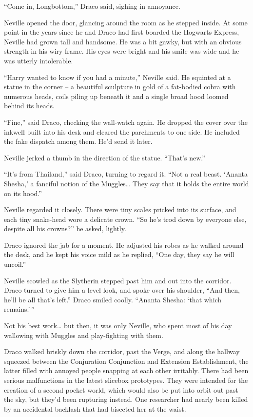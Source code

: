 ``Come in, Longbottom,'' Draco said, sighing in annoyance.

Neville opened the door, glancing around the room as he stepped inside.
At some point in the years since he and Draco had first boarded the
Hogwarts Express, Neville had grown tall and handsome. He was a bit
gawky, but with an obvious strength in his wiry frame. His eyes were
bright and his smile was wide and he was utterly intolerable.

``Harry wanted to know if you had a minute,'' Neville said. He squinted
at a statue in the corner -- a beautiful sculpture in gold of a
fat-bodied cobra with numerous heads, coils piling up beneath it and a
single broad hood loomed behind its heads.

``Fine,'' said Draco, checking the wall-watch again. He dropped the
cover over the inkwell built into his desk and cleared the parchments to
one side. He included the fake dispatch among them. He'd send it later.

Neville jerked a thumb in the direction of the statue. ``That's new.''

``It's from Thailand,'' said Draco, turning to regard it. ``Not a real
beast. `Ananta Shesha,' a fanciful notion of the Muggles\ldots{} They
say that it holds the entire world on its hood.''

Neville regarded it closely. There were tiny scales pricked into its
surface, and each tiny snake-head wore a delicate crown. ``So he's trod
down by everyone else, despite all his crowns?'' he asked, lightly.

Draco ignored the jab for a moment. He adjusted his robes as he walked
around the desk, and he kept his voice mild as he replied, ``One day,
they say he will uncoil.''

Neville scowled as the Slytherin stepped past him and out into the
corridor. Draco turned to give him a level look, and spoke over his
shoulder, ``And then, he'll be all that's left.'' Draco smiled coolly.
``Ananta Shesha: `that which remains.'\,''

Not his best work\ldots{} but then, it was only Neville, who spent most
of his day wallowing with Muggles and play-fighting with them.

Draco walked briskly down the corridor, past the Verge, and along the
hallway squeezed between the Conjuration Conjunction and Extension
Establishment, the latter filled with annoyed people snapping at each
other irritably. There had been serious malfunctions in the latest
slicebox prototypes. They were intended for the creation of a second
pocket world, which would also be put into orbit out past the sky, but
they'd been rupturing instead. One researcher had nearly been killed by
an accidental backlash that had bisected her at the waist.

